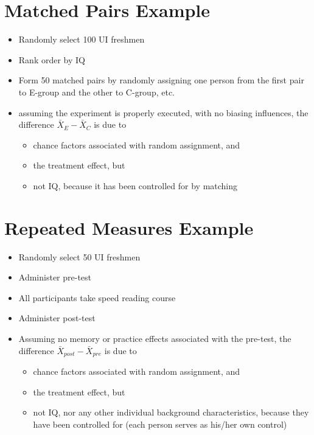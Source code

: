 \documentclass[12pt]{article}
\begin{document}
\section{Matched Pairs Example}\label{matched-pairs-example}

\begin{itemize}
\itemsep1pt\parskip0pt
\item
  Randomly select 100 UI freshmen
\item
  Rank order by IQ
\item
  Form 50 matched pairs by randomly assigning one person from the first
  pair to E-group and the other to C-group, etc.
\item
  assuming the experiment is properly executed, with no biasing
  influences, the difference \(\bar{X}_{E} - \bar{X}_{C}\) is due to

  \begin{itemize}
  \itemsep1pt\parskip0pt
  \item
    chance factors associated with random assignment, and
  \item
    the treatment effect, but
  \item
    not IQ, because it has been controlled for by matching
  \end{itemize}
\end{itemize}

\section{Repeated Measures Example}\label{repeated-measures-example}

\begin{itemize}
\itemsep1pt\parskip0pt
\item
  Randomly select 50 UI freshmen
\item
  Administer pre-test
\item
  All participants take speed reading course
\item
  Administer post-test
\item
  Assuming no memory or practice effects associated with the pre-test,
  the difference \(\bar{X}_{post} - \bar{X}_{pre}\) is due to

  \begin{itemize}
  \itemsep1pt\parskip0pt
  \item
    chance factors associated with random assignment, and
  \item
    the treatment effect, but
  \item
    not IQ, nor any other individual background characteristics, because
    they have been controlled for (each person serves as his/her own
    control)
  \end{itemize}
\end{itemize}
\end{document}
